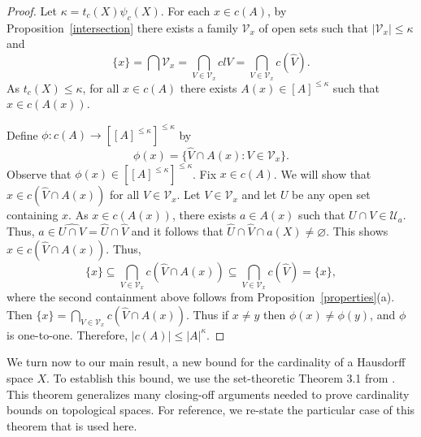 \documentclass[11pt]{amsart}
\theoremstyle{definition}
\theoremstyle{remark}
\numberwithin{equation}{section}
\begin{document}
\begin{proof}
Let $\kappa=t_c(X)\psi_c(X)$. For each $x\in c(A)$, by Proposition~\ref{intersection} there exists a family ${\ensuremath{\mathcal{{V}}}}_x$ of open sets such that $|{\ensuremath{\mathcal{{V}}}}_x|\leq\kappa$ and
$$\{x\}={\bigcap}{\ensuremath{\mathcal{{V}}}}_x={\bigcap}_{V\in{\ensuremath{\mathcal{{V}}}}_x}clV={\bigcap}_{V\in{\ensuremath{\mathcal{{V}}}}_x}c(\widehat{V}).$$
As $t_c(X)\leq\kappa$, for all $x\in c(A)$ there exists $A(x)\in[A]^{\leq\kappa}$ such that $x\in c(A(x))$.

Define $\phi:c(A)\to\left[[A]^{\leq\kappa}\right]^{\leq\kappa}$ by 
$$\phi(x)=\{\widehat{V}{\cap} A(x):V\in{\ensuremath{\mathcal{{V}}}}_x\}.$$
Observe that $\phi(x)\in\left[[A]^{\leq\kappa}\right]^{\leq\kappa}$. Fix $x\in c(A)$. We will show that $x\in c(\widehat{V}{\cap} A(x))$ for all $V\in{\ensuremath{\mathcal{{V}}}}_x$. Let $V\in{\ensuremath{\mathcal{{V}}}}_x$ and let $U$ be any open set containing $x$. As $x\in c(A(x))$, there exists $a\in A(x)$ such that $U{\cap} V\in{\ensuremath{\mathcal{{U}}}}_a$. Thus, $a\in\widehat{U{\cap} V}=\widehat{U}{\cap}\widehat{V}$ and it follows that $\widehat{U}{\cap}\widehat{V}{\cap} a(X)\neq{\varnothing}$. This shows $x\in c(\widehat{V}{\cap} A(x))$. Thus, 
$$\{x\}{\subseteq}{\bigcap}_{V\in{\ensuremath{\mathcal{{V}}}}_x}c(\widehat{V}{\cap} A(x)){\subseteq}{\bigcap}_{V\in{\ensuremath{\mathcal{{V}}}}_x}c(\widehat{V})=\{x\},$$
where the second containment above follows from Proposition~\ref{properties}(a). Then $\{x\}={\bigcap}_{V\in{\ensuremath{\mathcal{{V}}}}_x}c(\widehat{V}{\cap} A(x))$. Thus if $x\neq y$ then $\phi(x)\neq\phi(y)$, and $\phi$ is one-to-one. Therefore, $|c(A)|\leq |A|^{\kappa}$.
\end{proof}

We turn now to our main result, a new bound for the cardinality of a Hausdorff space $X$. To establish this bound, we use the set-theoretic Theorem 3.1 from \cite{Hodel2006}. This theorem generalizes many closing-off arguments needed to prove cardinality bounds on topological spaces. For reference, we re-state the particular case of this theorem that is used here. 
\end{document}
